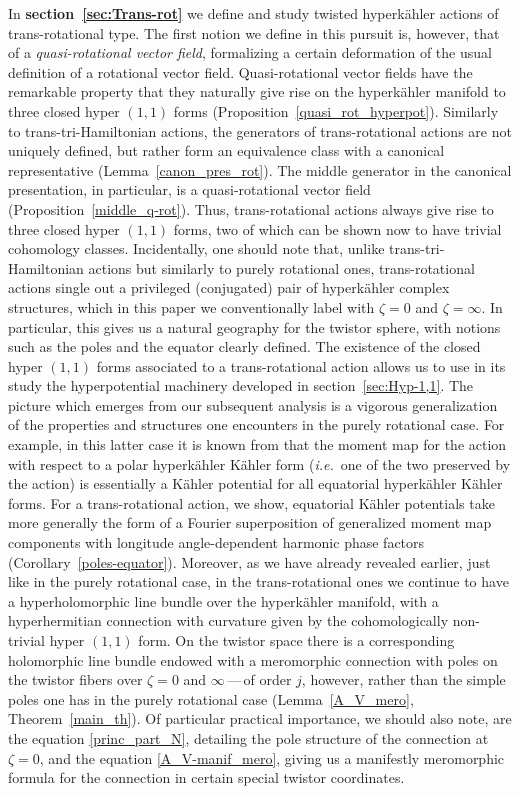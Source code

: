 \documentclass[11pt]{amsart}
\theoremstyle{remark}
\theoremstyle{remark}
\theoremstyle{definition}
\theoremstyle{definition}
\theoremstyle{definition}
\newcommand{\0}{{\scriptstyle 0'}} %
\newcommand{\1}{{\scriptstyle 1'}}
\begin{document}
In \textbf{section~\ref{sec:Trans-rot}} we define and study twisted hyperk\"ahler actions of trans-rotational type. The first notion we define in this pursuit is, however, that of a \textit{quasi-rotational vector field}, formalizing a certain deformation of the usual definition of a rotational vector field. Quasi-rotational vector fields have the remarkable property that they naturally give rise on the hyperk\"ahler manifold to three closed hyper \mbox{$(1,1)$} forms (Proposition~\ref{quasi_rot_hyperpot}). Similarly to trans-tri-Hamiltonian actions, the generators of trans-rotational actions are not uniquely defined, but rather form an equivalence class with a canonical representative (Lemma~\ref{canon_pres_rot}). The middle generator in the canonical presentation, in particular, is a quasi-rotational vector field (Proposition~\ref{middle_q-rot}). Thus, trans-rotational actions always give rise to three closed hyper \mbox{$(1,1)$} forms, two of which can be shown now to have trivial cohomology classes. Incidentally, one should note that, unlike trans-tri-Hamiltonian actions but similarly to purely rotational ones, trans-rotational actions single out a privileged (conjugated) pair of hyperk\"ahler complex structures, which in this paper we conventionally label with \mbox{$\zeta = 0$} and \mbox{$\zeta = \infty$}. In particular, this gives us a natural geography for the twistor sphere, with notions such as the poles and the equator clearly defined. The existence of the closed hyper \mbox{$(1,1)$} forms associated to a trans-rotational action allows us to use in its study the hyperpotential machinery developed in section~\ref{sec:Hyp-1,1}. The picture which emerges from our subsequent analysis is a vigorous generalization of the properties and structures one encounters in the purely rotational case. For example, in this latter case it is known from \cite{MR877637} that the moment map for the action with respect to a polar hyperk\"ahler K\"ahler form (\textit{i.e.}~one of the two preserved by the action) is essentially a K\"ahler potential for all equatorial hyperk\"ahler K\"ahler forms. For a trans-rotational action, we show, equatorial K\"ahler potentials take more generally the form of a Fourier superposition of generalized moment map components with longitude angle-dependent harmonic phase factors (Corollary~\ref{poles-equator}). Moreover, as we have already revealed earlier, just like in the purely rotational case, in the trans-rotational ones we continue to have a hyperholomorphic line bundle over the hyperk\"ahler manifold, with a hyperhermitian connection with curvature given by the cohomologically non-trivial hyper \mbox{$(1,1)$} form. On the twistor space there is a corresponding holomorphic line bundle endowed with a meromorphic connection with poles on the twistor fibers over \mbox{$\zeta = 0$} and $\infty$\,---\,of order $j$, however, rather than the simple poles one has in the purely rotational case (Lemma~\ref{A_V_mero}, Theorem~\ref{main_th}). Of particular practical importance, we should also note, are the equation \eqref{princ_part_N}, detailing the pole structure of the connection at \mbox{$\zeta = 0$}, and the equation \eqref{A_V-manif_mero}, giving us a manifestly meromorphic formula for the connection in certain special twistor coordinates. 
\end{document}
